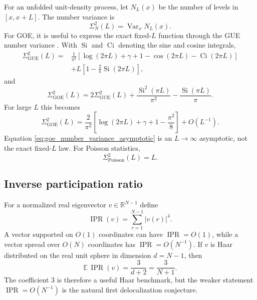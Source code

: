 \documentclass[11pt]{amsart}
\numberwithin{equation}{section}
\theoremstyle{plain}
\theoremstyle{definition}
\theoremstyle{remark}
\newcommand{\IPR}{\operatorname{IPR}}
\newcommand{\GOE}{\mathrm{GOE}}
\newcommand{\GUE}{\mathrm{GUE}}
\newcommand{\Poisson}{\mathrm{Poisson}}
\newcommand{\Var}{\operatorname{Var}}
\begin{document}
For an unfolded unit-density process, let $N_L(x)$ be the number of levels in $[x,x+L]$.  The number variance is
\begin{equation}
\Sigma_N^2(L)=\Var_x N_L(x).
\label{eq:number_variance_definition}
\end{equation}
For GOE, it is useful to express the exact fixed-$L$ function through the GUE number variance \cite{Mehta2004,BGS1984}.  With $\operatorname{Si}$ and $\operatorname{Ci}$ denoting the sine and cosine integrals,
\begin{align}
\Sigma_{\GUE}^2(L)
={}&\frac{1}{\pi^2}
\left[
\log(2\pi L)+\gamma+1-\cos(2\pi L)-\operatorname{Ci}(2\pi L)
\right]
\label{eq:gue_number_variance_first}\\
&+L\left[1-\frac{2}{\pi}\operatorname{Si}(2\pi L)\right],
\label{eq:gue_number_variance_second}
\end{align}
and
\begin{equation}
\Sigma_{\GOE}^2(L)
=
2\Sigma_{\GUE}^2(L)
+
\frac{\operatorname{Si}^2(\pi L)}{\pi^2}
-
\frac{\operatorname{Si}(\pi L)}{\pi}.
\label{eq:goe_number_variance_exact}
\end{equation}
For large $L$ this becomes
\begin{equation}
\Sigma_{\GOE}^2(L)
=
\frac{2}{\pi^2}
\left[
\log(2\pi L)+\gamma+1-\frac{\pi^2}{8}
\right]
+O(L^{-1}).
\label{eq:goe_number_variance_asymptotic}
\end{equation}
Equation \eqref{eq:goe_number_variance_asymptotic} is an $L\to\infty$ asymptotic, not the exact fixed-$L$ law.  For Poisson statistics,
\begin{equation}
\Sigma_{\Poisson}^2(L)=L.
\label{eq:poisson_number_variance}
\end{equation}

\subsection{Inverse participation ratio}
\label{subsec:ipr}

For a normalized real eigenvector $v\in\mathbb R^{N-1}$ define
\begin{equation}
\IPR(v)=\sum_{r=1}^{N-1}|v(r)|^4.
\label{eq:ipr_definition}
\end{equation}
A vector supported on $O(1)$ coordinates can have $\IPR=O(1)$, while a vector spread over $O(N)$ coordinates has $\IPR=O(N^{-1})$.  If $v$ is Haar distributed on the real unit sphere in dimension $d=N-1$, then
\begin{equation}
\mathbb E\,\IPR(v)=\frac{3}{d+2}=\frac{3}{N+1}.
\label{eq:haar_ipr}
\end{equation}
The coefficient $3$ is therefore a useful Haar benchmark, but the weaker statement $\IPR=O(N^{-1})$ is the natural first delocalization conjecture.
\end{document}

